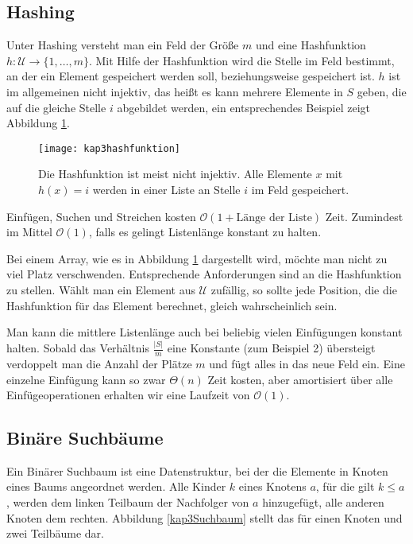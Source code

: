 \subsection{Hashing}
Unter Hashing versteht man ein Feld der Größe $m$ und eine Hashfunktion $h : \mathcal{U}\rightarrow \{ 1, \ldots, m \}$. Mit Hilfe der Hashfunktion wird die Stelle im Feld bestimmt, an der ein Element gespeichert werden soll, beziehungsweise gespeichert ist. $h$ ist im allgemeinen nicht injektiv, das heißt es kann mehrere Elemente in $S$ geben, die auf die gleiche Stelle $i$ abgebildet werden, ein entsprechendes Beispiel zeigt Abbildung \ref{kap3hashfunktion}.

\begin{figure}[htb]
  \centering
  \texttt{[image: kap3hashfunktion]}
  \caption{Die Hashfunktion ist meist nicht injektiv. Alle Elemente $x$ mit $h(x) = i$ werden in einer Liste an Stelle $i$ im Feld gespeichert.}
  \label{kap3hashfunktion}
\end{figure}

Einfügen, Suchen und Streichen kosten $\mathcal{O}(1 + \text{Länge der Liste})$ Zeit. Zumindest im Mittel $\mathcal{O}(1)$, falls es gelingt Listenlänge konstant zu halten.

Bei einem Array, wie es in Abbildung \ref{kap3hashfunktion} dargestellt wird, möchte man nicht zu viel Platz verschwenden. Entsprechende Anforderungen sind an die Hashfunktion zu stellen. Wählt man ein Element aus $\mathcal{U}$ zufällig, so sollte jede Position, die die Hashfunktion für das Element berechnet, gleich wahrscheinlich sein.

Man kann die mittlere Listenlänge auch bei beliebig vielen Einfügungen konstant halten. Sobald das Verhältnis  $\frac{|S|}{m}$ eine Konstante (zum Beispiel 2) übersteigt verdoppelt man die Anzahl der Plätze $m$ und fügt alles in das neue Feld ein. Eine einzelne Einfügung kann so zwar $\Theta(n)$ Zeit kosten, aber amortisiert über alle Einfügeoperationen erhalten wir eine Laufzeit von $\mathcal{O}(1)$.

\subsection{Binäre Suchbäume}
Ein Binärer Suchbaum ist eine Datenstruktur, bei der die Elemente in Knoten eines Baums angeordnet werden. Alle Kinder $k$ eines Knotens $a$, für die gilt $k \le a$, werden dem linken Teilbaum der Nachfolger von $a$ hinzugefügt, alle anderen Knoten dem rechten. Abbildung \ref{kap3Suchbaum} stellt das für einen Knoten und zwei Teilbäume dar.

